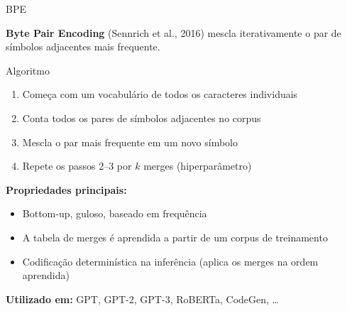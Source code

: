 \documentclass[aspectratio=169,xcolor=dvipsnames]{beamer}
\begin{document}
\begin{frame}{BPE}

\textbf{Byte Pair Encoding} (Sennrich et al., 2016) mescla iterativamente o par de símbolos adjacentes mais frequente.

\vspace{6pt}

\begin{block}{Algoritmo}
\begin{enumerate}
    \item Começa com um vocabulário de todos os caracteres individuais
    \item Conta todos os pares de símbolos adjacentes no corpus
    \item Mescla o par mais frequente em um novo símbolo
    \item Repete os passos 2--3 por $k$ merges (hiperparâmetro)
\end{enumerate}
\end{block}

\vspace{6pt}

\textbf{Propriedades principais:}
\begin{itemize}
    \item Bottom-up, guloso, baseado em frequência
    \item A tabela de merges é aprendida a partir de um corpus de treinamento
    \item Codificação determinística na inferência (aplica os merges na ordem aprendida)
\end{itemize}

\vspace{4pt}
\centering
\textbf{Utilizado em:} GPT, GPT-2, GPT-3, RoBERTa, CodeGen, \ldots

\end{frame}

\end{document}
